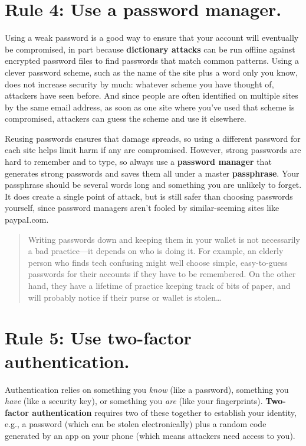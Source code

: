 \documentclass[10pt, letterpaper]{article}
\begin{document}
\section*{Rule 4: Use a password manager.}

Using a weak password is a good way to ensure that your account will eventually
be compromised, in part because \textbf{dictionary attacks} can be run offline
against encrypted password files to find passwords that match common
patterns. Using a clever password scheme, such as the name of the site plus a
word only you know, does not increase security by much: whatever scheme you have
thought of, attackers have seen before. And since people are often identified on
multiple sites by the same email address, as soon as one site where you've used
that scheme is compromised, attackers can guess the scheme and use it elsewhere.

Reusing passwords ensures that damage spreads, so using a different password for
each site helps limit harm if any are compromised. However, strong passwords are
hard to remember and to type, so always use a \textbf{password manager} that
generates strong passwords and saves them all under a master \textbf{passphrase}.
Your passphrase should be several words long and something you are unlikely to
forget. It does create a single point of attack, but is still safer than
choosing passwords yourself, since password managers aren't fooled by
similar-seeming sites like paypaI.com.

\begin{quote}
  Writing passwords down and keeping them in your wallet is not necessarily a
  bad practice---it depends on who is doing it. For example, an elderly person
  who finds tech confusing might well choose simple, easy-to-guess passwords for
  their accounts if they have to be remembered. On the other hand, they have a
  lifetime of practice keeping track of bits of paper, and will probably notice
  if their purse or wallet is stolen\ldots{}
\end{quote}

\section*{Rule 5: Use two-factor authentication.}

Authentication relies on something you \emph{know} (like a password), something
you \emph{have} (like a security key), or something you \emph{are} (like your
fingerprints). \textbf{Two-factor authentication} requires two of these together
to establish your identity, e.g., a password (which can be stolen
electronically) plus a random code generated by an app on your phone (which
means attackers need access to you).
\end{document}

